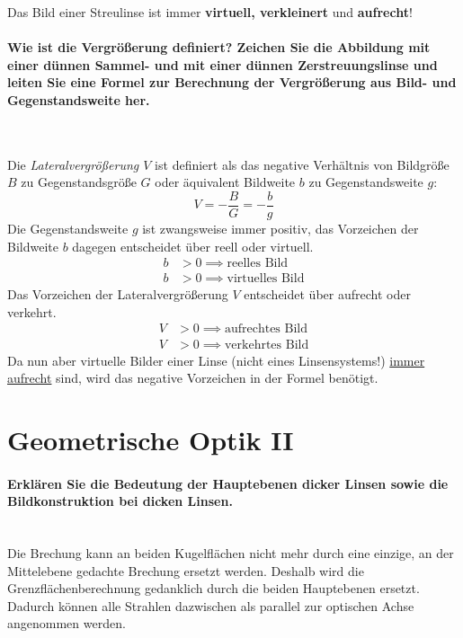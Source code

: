 \documentclass[a4paper, 11pt, ngerman, parskip=half-]{scrartcl}
\begin{document}
Das Bild einer Streulinse ist immer \textbf{virtuell, verkleinert} und \textbf{aufrecht}!

\paragraph{Wie ist die Vergrößerung definiert? Zeichen Sie die Abbildung mit einer dünnen Sammel- und mit einer dünnen
    Zerstreuungslinse und leiten Sie eine Formel zur Berechnung der Vergrößerung aus Bild- und Gegenstandsweite her.} ~

Die \textit{Lateralvergrößerung $V$} ist definiert als das negative Verhältnis von Bildgröße $B$ zu Gegenstandsgröße $G$ oder äquivalent Bildweite $b$ zu Gegenstandsweite $g$:
\begin{equation}
    V = -\frac{B}{G} = -\frac{b}{g}
\end{equation}
Die Gegenstandsweite $g$ ist zwangsweise immer positiv, das Vorzeichen der Bildweite $b$ dagegen entscheidet über reell oder virtuell.
\begin{align*}
    b & > 0 \implies \text{reelles Bild}    \\
    b & > 0 \implies \text{virtuelles Bild}
\end{align*}
Das Vorzeichen der Lateralvergrößerung $V$ entscheidet über aufrecht oder verkehrt.
\begin{align*}
    V & > 0 \implies \text{aufrechtes Bild} \\
    V & > 0 \implies \text{verkehrtes Bild}
\end{align*}
Da nun aber virtuelle Bilder einer Linse (nicht eines Linsensystems!) \underline{immer aufrecht} sind, wird das negative Vorzeichen in der Formel benötigt.

\newpage

\section{Geometrische Optik II}

\paragraph{Erklären Sie die Bedeutung der Hauptebenen dicker Linsen sowie die Bildkonstruktion bei
    dicken Linsen.}~\\

Die Brechung kann an beiden Kugelflächen nicht mehr durch eine einzige, an der Mittelebene gedachte Brechung ersetzt werden.
Deshalb wird die Grenzflächenberechnung gedanklich durch die beiden Hauptebenen ersetzt. Dadurch können alle Strahlen dazwischen
als parallel zur optischen Achse angenommen werden.
\end{document}
